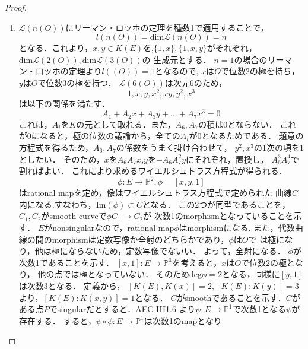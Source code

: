 \documentclass{ujarticle}
\begin{document}
\begin{proof}
  \begin{enumerate}
    \item $\mathcal{L}(n(O))$にリーマン・ロッホの定理を種数1で適用することで，
    \begin{equation*}
      l(n(O)) = \mathrm{dim} \mathcal{L}(n(O)) = n
    \end{equation*}
    となる．これより，$x,y \in K(E)$を,$\{ 1,x\},\{1,x,y\}$がそれぞれ，
    $\mathrm{dim}\mathcal{L}(2(O)),\mathrm{dim}\mathcal{L}(3(O))$の
    生成元とする．
    $n=1$の場合のリーマン・ロッホの定理より$l((O))=1$となるので,
    $x$は$O$で位数2の極を持ち，
    $y$は$O$で位数3の極を持つ．
    $\mathcal{L}(6(O))$は次元6のため，
    \begin{equation*}
      1,x,y,x^2,xy,y^2,x^3
    \end{equation*}
    は以下の関係を満たす．
    \begin{equation*}
      A_1 + A_2x + A_3y + \dots + A_7x^3=0
    \end{equation*}
    これは，$A_i$を$K$の元として取れる．また，$A_6,A_7$の積は0とならない．
    これが0になると，極の位数の議論から，全ての$A_i$が0となるためである．
    題意の方程式を得るため，$A_6,A_7$の係数をうまく掛け合わせて，
    $y^2,x^3$の1次の項を1としたい．
    そのため，$x$を$A_6A_7x$,$y$を$-A_6A_7^2y$にそれぞれ，置換し，
    $A_6^3A_7^4$で割ればよい．
    これにより求めるワイエルシュトラス方程式が得られる．
    \begin{equation*}
     \phi: E \to \mathbb{P}^2, \phi = [x,y,1]
    \end{equation*}
    はrational mapを定め，像はワイエルシュトラス方程式で定められた
    曲線$C$内になる.すなわち，$\mathrm{Im}(\phi) \subset C$となる．
    この2つが同型であることを，$C_1,C_2$がsmooth curveで$\phi C_1 \to C_2$が
    次数1のmorphismとなっていることを示す．
    $E$がnonsingularなので，rational map$\phi$はmorphismになる.
    また，代数曲線の間のmorphismは定数写像か全射のどちらかであり，$\phi$は$O$で
    は極になり，他は極にならないため，定数写像でないい．
    よって，全射になる．
    $\phi$が次数1であることを示す．
    $[x,1]:E \to \mathbb{P^1}$を考えると，$x$は$O$で位数2の極となり，
    他の点では極となっていない．
    そのため$\mathrm{deg}\phi=2$となる，同様に$[y,1]$は次数3となる．
    定義から，
    $[K(E),K(x)]=2,[K(E):K(y)]=3$より，$[K(E):K(x,y)]=1$となる．
    $C$がsmoothであることを示す．$C$がある点$P$でsingularだとすると．AEC III1.6
    より$\psi:E \to \mathbb{P}^1$で次数1となる$\psi$が存在する．
    すると，$\psi \circ \phi:E \to \mathbb{P}^1$は次数1のmapとなり

\end{enumerate}
\end{proof}
\end{document}
